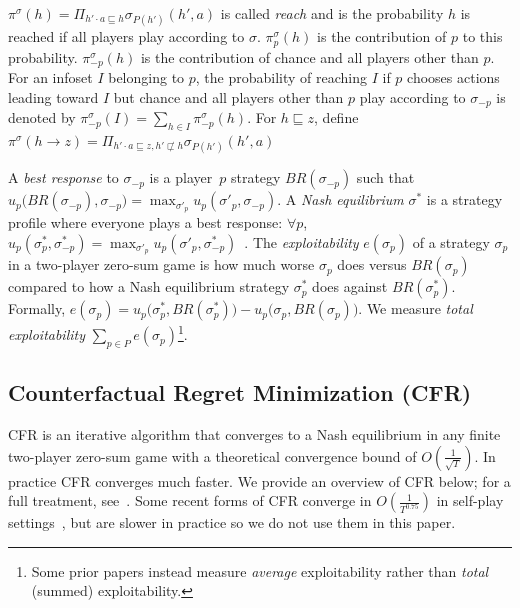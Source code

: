 \documentclass{article}
\newcommand{\adam}[1]{\textbf{\textcolor{magenta}{#1}}}
\begin{document}
$\pi^{\sigma}(h) = \Pi_{h' \cdot a \sqsubseteq h} \sigma_{P(h')}(h',a)$ is called {\em reach} and is the probability $h$ is reached if all players play according to $\sigma$. $\pi^{\sigma}_p(h)$ is the contribution of $p$ to this probability.
$\pi^{\sigma}_{-p}(h)$ is the contribution of chance and all players other than $p$.
For an infoset $I$ belonging to $p$, the probability of reaching $I$ if $p$ chooses actions leading toward $I$ but chance and all players other than $p$ play according to $\sigma_{-p}$ is denoted by $\pi^{\sigma}_{-p}(I) = \sum_{h \in I}\pi^{\sigma}_{-p}(h)$.
For $h \sqsubseteq z$, define $\pi^\sigma(h \to z) = \Pi_{h' \cdot a \sqsubseteq z,h'\not\sqsubset h} \sigma_{P(h')}(h',a)$ 

A {\em best response} to $\sigma_{-p}$ is a player~$p$ strategy $BR(\sigma_{-p})$ such that $u_p\big(BR(\sigma_{-p}), \sigma_{-p}\big) = \max_{\sigma'_p} u_p(\sigma'_p, \sigma_{-p})$.
A {\em Nash equilibrium} $\sigma^*$ is a strategy profile where everyone plays a best response: $\forall p$, $u_p(\sigma^*_p, \sigma^*_{-p}) = \max_{\sigma'_p} u_p(\sigma'_p, \sigma^*_{-p})$~\cite{Nash50:Eq}.
The {\em exploitability} $e(\sigma_p)$ of a strategy $\sigma_p$ in a two-player zero-sum game is how much worse $\sigma_p$ does versus $BR(\sigma_p)$ compared to how a Nash equilibrium strategy $\sigma^*_p$ does against $BR(\sigma^*_p)$. Formally, $e(\sigma_p) = u_p\big(\sigma_p^*,BR(\sigma_p^*)\big) - u_p\big(\sigma_p,BR(\sigma_p)\big)$. We measure \emph{total exploitability} $\sum_{p \in P} e(\sigma_p)$\footnote{Some prior papers instead measure \emph{average} exploitability rather than \emph{total} (summed) exploitability.}.

\subsection{Counterfactual Regret Minimization (CFR)}
\vspace{-0.03in}
CFR is an iterative algorithm that converges to a Nash equilibrium in any finite two-player zero-sum game with a theoretical convergence bound of $O(\frac{1}{\sqrt{T}})$. In practice CFR converges much faster. We provide an overview of CFR below; for a full treatment, see~\citet{Zinkevich07:Regret}. Some recent forms of CFR converge in $O(\frac{1}{T^{0.75}})$ in self-play settings~\cite{Farina19:Stable}, but are slower in practice so we do not use them in this paper.
\end{document}
